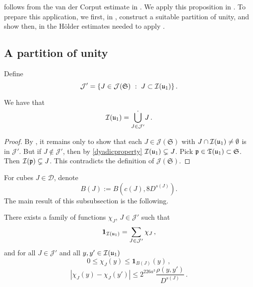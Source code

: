  follows from the van der Corput estimate in . We apply this proposition in . To prepare this application, we first, in , construct a suitable partition of unity, and show then, in  the H\"older estimates needed to apply .

\subsection{A partition of unity}
\label{subsubsec-pao}
    Define
    $$
        \mathcal{J}' = \{J \in \mathcal{J}(\mathfrak{S}) \ : \ J \subset {\mathcal{I}}({\mathfrak u}_1)\}\,.
    $$

    \begin{lemma}
        \label{dyadic-partition-1}
        \leanok
        We have that
        $$
            {\mathcal{I}}({\mathfrak u}_1) = \dot{\bigcup_{J \in \mathcal{J}'}} J\,.
        $$
    \end{lemma}

    \begin{proof}
        By , it remains only to show that each $J \in \mathcal{J}(\mathfrak{S})$ with $J \cap {\mathcal{I}}({\mathfrak u}_1) \ne \emptyset$ is in $\mathcal{J}'$. But if $J \notin \mathcal{J}'$, then by \eqref{dyadicproperty} ${\mathcal{I}}({\mathfrak u}_1) \subsetneq J$. Pick ${\mathfrak p} \in {\mathfrak T}({\mathfrak u}_1) \subset \mathfrak{S}$. Then ${\mathcal{I}}({\mathfrak p}) \subsetneq J$. This contradicts the definition of $\mathcal{J}(\mathfrak{S})$.
    \end{proof}

    For cubes $J \in \mathcal{D}$, denote
    \begin{equation}
        \label{def-BJ}
        B(J) := B(c(J), 8D^{s(J)}).
    \end{equation}
    The main result of this subsubsection is the following.

    \begin{lemma}
        \label{Lipschitz-partition-unity}
        \leanok
        There exists a family of functions $\chi_J$, $J \in \mathcal{J}'$ such that \begin{equation}
            \label{eq-pao-1}
            \mathbf{1}_{{\mathcal{I}}({\mathfrak u}_1)} = \sum_{J \in \mathcal{J}'} \chi_J\,,
        \end{equation}
        and for all $J \in \mathcal{J}'$ and all $y,y' \in {\mathcal{I}}({\mathfrak u}_1)$
      \begin{equation}
            \label{eq-pao-2}
            0 \leq \chi_J(y) \leq \mathbf{1}_{B(J)}(y)\,,
        \end{equation}
      \begin{equation}
            \label{eq-pao-3}
            |\chi_J(y) - \chi_J(y')| \le 2^{226a^3} \frac{\rho(y,y')}{D^{s(J)}}\,.
        \end{equation}
    \end{lemma}

